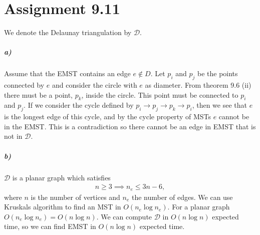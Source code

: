 \documentclass[10pt,a4paper,final,oneside,openany,article,oldfontcommands]{memoir}
\newcommand{\D}{\mathcal{D}}
\begin{document}
\chapter*{Assignment 9.11}
We denote the Delaunay triangulation by $\D$.
\paragraph{a)}
Assume that the EMST contains an edge $e \notin D$. Let $p_i$ and $p_j$ be the points connected by $e$ and consider the circle with $e$ as diameter. From theorem 9.6 (ii) there must be a point, $p_k$, inside the circle. This point must be connected to $p_i$ and $p_j$. If we consider the cycle defined by $p_i \to p_j \to p_k \to p_i$, then we see that $e$ is the longest edge of this cycle, and by the cycle property of MSTs $e$ cannot be in the EMST. This is a contradiction so there cannot be an edge in EMST that is not in $\D$.


\paragraph{b)}
$\D$ is a planar graph which satisfies
\begin{align*}
  n \ge 3 \implies n_e \le 3n - 6,
\end{align*}
where $n$ is the number of vertices and $n_e$ the number of edges. We can use Kruskals algorithm to find an MST in $O(n_e \log n_e)$. For a planar graph $O(n_e \log n_e) = O(n \log n)$. We can compute $\D$ in $O(n \log n)$ expected time, so we can find EMST in $O(n \log n)$ expected time.

\printbibliography
\end{document}
